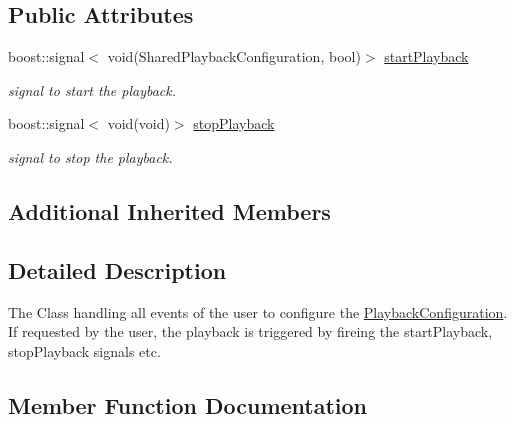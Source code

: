 \subsection*{Public Attributes}
\begin{DoxyCompactItemize}
\item 
\hypertarget{class_playback_tab_handler_a55204c881813178243e48ce120703421}{}boost\+::signal$<$ void(Shared\+Playback\+Configuration, bool)$>$ \hyperlink{class_playback_tab_handler_a55204c881813178243e48ce120703421}{start\+Playback}\label{class_playback_tab_handler_a55204c881813178243e48ce120703421}

\begin{DoxyCompactList}\small\item\em signal to start the playback. \end{DoxyCompactList}\item 
\hypertarget{class_playback_tab_handler_a254f9ac42f7f575071f7b0271408ab74}{}boost\+::signal$<$ void(void)$>$ \hyperlink{class_playback_tab_handler_a254f9ac42f7f575071f7b0271408ab74}{stop\+Playback}\label{class_playback_tab_handler_a254f9ac42f7f575071f7b0271408ab74}

\begin{DoxyCompactList}\small\item\em signal to stop the playback. \end{DoxyCompactList}\end{DoxyCompactItemize}
\subsection*{Additional Inherited Members}


\subsection{Detailed Description}
The Class handling all events of the user to configure the \hyperlink{class_playback_configuration}{Playback\+Configuration}. If requested by the user, the playback is triggered by fireing the start\+Playback, stop\+Playback signals etc. 

\subsection{Member Function Documentation}
\hypertarget{class_playback_tab_handler_aea458d2a38ab9b7940038f137a3a7ccf}{}
